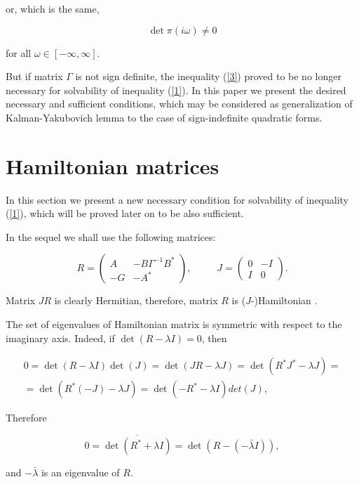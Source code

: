 \documentclass[11pt, reqno]{amsart}
\theoremstyle{plain}
\begin{document}
\noindent or, which is the same,

\begin{equation}\label{3}
\det \pi (i\omega ) \neq  0
\end{equation}

\noindent for all $\omega \in [-\infty, \infty ]$.

But if matrix $\Gamma $ is not sign definite, the inequality (\ref{3}) proved to be no
longer necessary for solvability of inequality (\ref{1}). In this paper we present the
desired necessary and sufficient conditions, which may be considered as generalization 
of Kalman-Yakubovich lemma to the case of sign-indefinite quadratic forms.

\section{Hamiltonian matrices}

In this section we present a new necessary condition for solvability of inequality
(\ref{1}), which will be proved later on to be also sufficient.

In the sequel we shall use the following matrices:

$$
R = \left(\begin{array}{cc}
A&-B\Gamma ^{-1}B^{*} \\
 -G&-A^{*}\end{array}\right) , \; \; \qquad J = \left(\begin{array}{cc}
0&-I \\
 I&0\end{array}\right).
$$

Matrix $JR$ is clearly Hermitian, therefore, matrix $R$ is ($J$-)Hamiltonian \cite{Hamiltonianmatrices}.

The set of eigenvalues of Hamiltonian matrix is symmetric with respect to the imaginary axis. Indeed, if $\det(R-\lambda I)=0$, then 

$$\begin{array}{c} 0 = \det(R-\lambda I)\det(J)=\det(JR-\lambda J) = \det(R^{*}J^{*}-\lambda J) = \\
=\det(R^{*}(-J)-\lambda J) = \det(-R^{*}-\lambda I)det(J),\end{array}$$

\noindent Therefore

$$ 0 = \overline{\det(R^{*}+\lambda I)} = \det(R-(-\bar\lambda I)),$$

\noindent and $-\bar\lambda$ is an eigenvalue of $R$.
\end{document}
